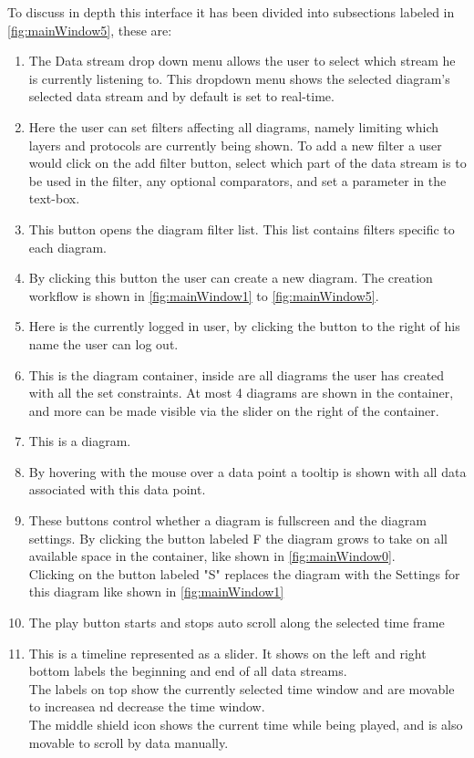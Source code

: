 \documentclass[twoside, english, final]{Pflichtenheft}
\begin{document}
To discuss in depth this interface it has been divided into subsections labeled in \autoref{fig:mainWindow5}, these are:
\\
\begin{enumerate}
	\item The Data stream drop down menu allows the user to select which stream he is currently listening to. This dropdown menu shows the selected diagram's selected data stream and by default is set to real-time.
	\item Here the user can set filters affecting all diagrams, namely limiting which layers and protocols are currently being shown. To add a new filter a user would click on the add filter button, select which part of the data stream is to be used in the filter, any optional comparators, and set a parameter in the text-box.
	\item This button opens the diagram filter list. This list contains filters specific to each diagram.
	\item By clicking this button the user can create a new diagram. The creation workflow is shown in \autoref{fig:mainWindow1} to \autoref{fig:mainWindow5}.
	\item Here is the currently logged in user, by clicking the button to the right of his name the user can log out.
	\item This is the \gls{diagram container}, inside are all diagrams the user has created with all the set constraints. At most 4 diagrams are shown in the container, and more can be made visible via the slider on the right of the container.
	\item This is a diagram.
	\item By hovering with the mouse over a data point a tooltip is shown with all data associated with this data point.
	\item These buttons control whether a diagram is fullscreen and the diagram settings. By clicking the button labeled F the diagram grows to take on all available space in the container, like shown in \autoref{fig:mainWindow0}.
	      \\
	      Clicking on the button labeled "S" replaces the diagram with the Settings for this diagram like shown in \autoref{fig:mainWindow1}
	\item The play button starts and stops auto scroll along the selected time frame
	\item This is a timeline represented as a slider. It shows on the left and right bottom labels the beginning and end of all data streams.
\\ The labels on top show the currently selected time window and are movable to increasea nd decrease the time window.
\\ The middle shield icon shows the current time while being played, and is also movable to scroll by data manually.

\end{enumerate}
\end{document}
